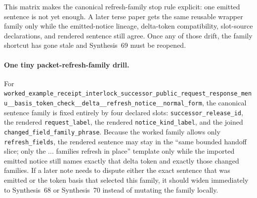 \documentclass[11pt]{article}
\begin{document}
This matrix makes the canonical refresh-family stop rule explicit: one emitted sentence is not yet enough. A later terse paper gets the same reusable wrapper family only while the emitted-notice lineage, delta-token compatibility, slot-source declarations, and rendered sentence still agree. Once any of those drift, the family shortcut has gone stale and Synthesis~69 must be reopened.\cite{series:workedexample}

\paragraph{One tiny packet-refresh-family drill.}
For \nolinkurl{worked_example_receipt_interlock_successor_public_request_response_menu__basis_token_check__delta__refresh_notice__normal_form}, the canonical sentence family is fixed entirely by four declared slots: \nolinkurl{successor_release_id}, the rendered \nolinkurl{request_label}, the rendered \nolinkurl{notice_kind_label}, and the joined \nolinkurl{changed_field_family_phrase}. Because the worked family allows only \nolinkurl{refresh_fields}, the rendered sentence may stay in the ``same bounded handoff slice; only the ... families refresh in place'' template only while the imported emitted notice still names exactly that delta token and exactly those changed families. If a later note needs to dispute either the exact sentence that was emitted or the token basis that selected this family, it should widen immediately to Synthesis~68 or Synthesis~70 instead of mutating the family locally.\cite{series:workedexample}
\end{document}
